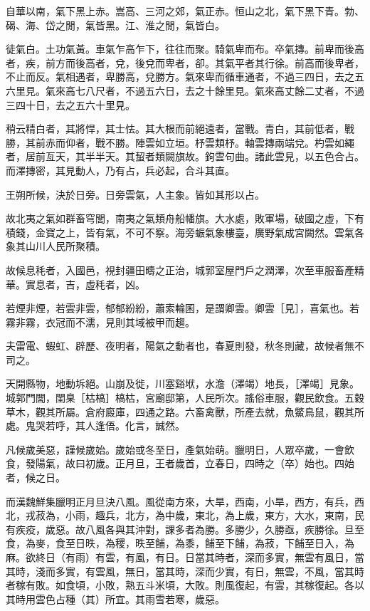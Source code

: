 自華以南，氣下黑上赤。嵩高、三河之郊，氣正赤。恒山之北，氣下黑下青。勃、碣、海、岱之閒，氣皆黑。江、淮之閒，氣皆白。

徒氣白。土功氣黃。車氣乍高乍下，往往而聚。騎氣卑而布。卒氣摶。前卑而後高者，疾，前方而後高者，兌，後兌而卑者，卻。其氣平者其行徐。前高而後卑者，不止而反。氣相遇者，卑勝高，兌勝方。氣來卑而循車通者，不過三四日，去之五六里見。氣來高七八尺者，不過五六日，去之十餘里見。氣來高丈餘二丈者，不過三四十日，去之五六十里見。

稍云精白者，其將悍，其士怯。其大根而前絕遠者，當戰。青白，其前低者，戰勝，其前赤而仰者，戰不勝。陣雲如立垣。杼雲類杼。軸雲摶兩端兌。杓雲如繩者，居前亙天，其半半天。其蛪者類闕旗故。鉤雲句曲。諸此雲見，以五色合占。而澤摶密，其見動人，乃有占，兵必起，合斗其直。

王朔所候，決於日旁。日旁雲氣，人主象。皆如其形以占。

故北夷之氣如群畜穹閭，南夷之氣類舟船幡旗。大水處，敗軍場，破國之虛，下有積錢，金寶之上，皆有氣，不可不察。海旁蜄氣象樓臺，廣野氣成宮闕然。雲氣各象其山川人民所聚積。

故候息秏者，入國邑，視封疆田疇之正治，城郭室屋門戶之潤澤，次至車服畜產精華。實息者，吉，虛秏者，凶。

若煙非煙，若雲非雲，郁郁紛紛，蕭索輪囷，是謂卿雲。卿雲［見］，喜氣也。若霧非霧，衣冠而不濡，見則其域被甲而趨。

夫雷電、蝦虹、辟歷、夜明者，陽氣之動者也，春夏則發，秋冬則藏，故候者無不司之。

天開縣物，地動坼絕。山崩及徙，川塞谿垘，水澹（澤竭）地長，［澤竭］見象。城郭門閭，閨臬［枯槁］槁枯，宮廟邸第，人民所次。謠俗車服，觀民飲食。五穀草木，觀其所屬。倉府廄庫，四通之路。六畜禽獸，所產去就，魚鱉鳥鼠，觀其所處。鬼哭若呼，其人逢俉。化言，誠然。

凡候歲美惡，謹候歲始。歲始或冬至日，產氣始萌。臘明日，人眾卒歲，一會飲食，發陽氣，故曰初歲。正月旦，王者歲首，立春日，四時之（卒）始也。四始者，候之日。

而漢魏鮮集臘明正月旦決八風。風從南方來，大旱，西南，小旱，西方，有兵，西北，戎菽為，小雨，趣兵，北方，為中歲，東北，為上歲，東方，大水，東南，民有疾疫，歲惡。故八風各與其沖對，課多者為勝。多勝少，久勝亟，疾勝徐。旦至食，為麥，食至日昳，為稷，昳至餔，為黍，餔至下餔，為菽，下餔至日入，為麻。欲終日（有雨）有雲，有風，有日。日當其時者，深而多實，無雲有風日，當其時，淺而多實，有雲風，無日，當其時，深而少實，有日，無雲，不風，當其時者稼有敗。如食頃，小敗，熟五斗米頃，大敗。則風復起，有雲，其稼復起。各以其時用雲色占種（其）所宜。其雨雪若寒，歲惡。

